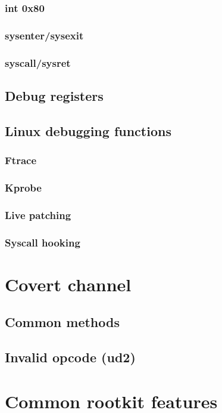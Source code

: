 \documentclass{article}
\begin{document}
\subsubsection{int 0x80}
\subsubsection{sysenter/sysexit}
\subsubsection{syscall/sysret}

\subsection{Debug registers}

\subsection{Linux debugging functions}
\subsubsection{Ftrace}
\subsubsection{Kprobe}
\subsubsection{Live patching}
\subsubsection{Syscall hooking}

\section{Covert channel}
\subsection{Common methods}
\subsection{Invalid opcode (ud2)}

\section{Common rootkit features}
\end{document}
